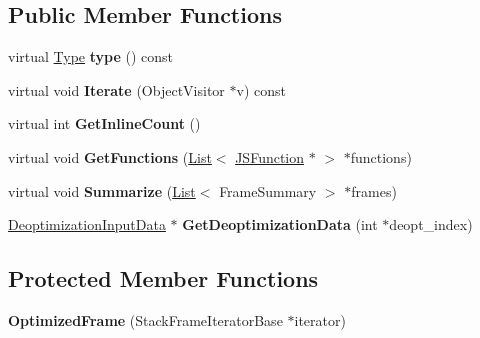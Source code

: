 \subsection*{Public Member Functions}
\begin{DoxyCompactItemize}
\item 
\hypertarget{classv8_1_1internal_1_1_optimized_frame_a94affe54c2de88a6d01bc49f5c0c96f3}{}virtual \hyperlink{classv8_1_1internal_1_1_type_impl}{Type} {\bfseries type} () const \label{classv8_1_1internal_1_1_optimized_frame_a94affe54c2de88a6d01bc49f5c0c96f3}

\item 
\hypertarget{classv8_1_1internal_1_1_optimized_frame_ae7db27421acf8efa9bf4b0132fed8999}{}virtual void {\bfseries Iterate} (Object\+Visitor $\ast$v) const \label{classv8_1_1internal_1_1_optimized_frame_ae7db27421acf8efa9bf4b0132fed8999}

\item 
\hypertarget{classv8_1_1internal_1_1_optimized_frame_a47fc9f5866a08067ec65db42977b051b}{}virtual int {\bfseries Get\+Inline\+Count} ()\label{classv8_1_1internal_1_1_optimized_frame_a47fc9f5866a08067ec65db42977b051b}

\item 
\hypertarget{classv8_1_1internal_1_1_optimized_frame_a57825fa185e7cd1c1be8018c29704053}{}virtual void {\bfseries Get\+Functions} (\hyperlink{classv8_1_1internal_1_1_list}{List}$<$ \hyperlink{classv8_1_1internal_1_1_j_s_function}{J\+S\+Function} $\ast$ $>$ $\ast$functions)\label{classv8_1_1internal_1_1_optimized_frame_a57825fa185e7cd1c1be8018c29704053}

\item 
\hypertarget{classv8_1_1internal_1_1_optimized_frame_a50d2342dbc3c21b319ec01a744b55c20}{}virtual void {\bfseries Summarize} (\hyperlink{classv8_1_1internal_1_1_list}{List}$<$ Frame\+Summary $>$ $\ast$frames)\label{classv8_1_1internal_1_1_optimized_frame_a50d2342dbc3c21b319ec01a744b55c20}

\item 
\hypertarget{classv8_1_1internal_1_1_optimized_frame_a22150b6e8d481034f584a9db5ff777eb}{}\hyperlink{classv8_1_1internal_1_1_deoptimization_input_data}{Deoptimization\+Input\+Data} $\ast$ {\bfseries Get\+Deoptimization\+Data} (int $\ast$deopt\+\_\+index)\label{classv8_1_1internal_1_1_optimized_frame_a22150b6e8d481034f584a9db5ff777eb}

\end{DoxyCompactItemize}
\subsection*{Protected Member Functions}
\begin{DoxyCompactItemize}
\item 
\hypertarget{classv8_1_1internal_1_1_optimized_frame_a1bbc29fa53c627003b0536cbaaadd379}{}{\bfseries Optimized\+Frame} (Stack\+Frame\+Iterator\+Base $\ast$iterator)\label{classv8_1_1internal_1_1_optimized_frame_a1bbc29fa53c627003b0536cbaaadd379}

\end{DoxyCompactItemize}
